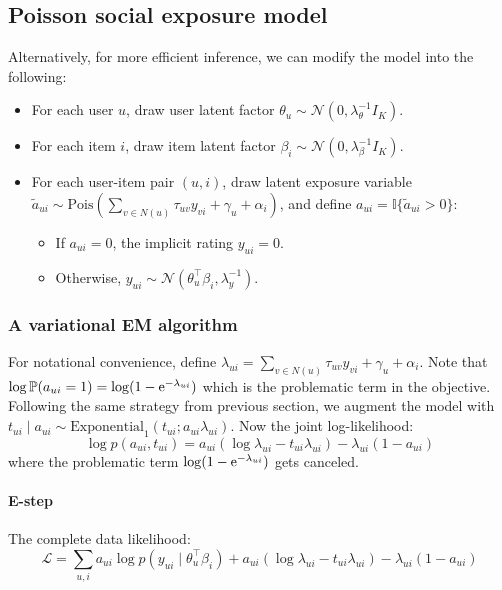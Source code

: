 \subsection*{Poisson social exposure model} Alternatively, for more efficient inference, we can modify the model into the following:
\begin{itemize}
\item For each user $u$, draw user latent factor $\theta_{u} \sim \mathcal{N}(0, \lambda_\theta^{-1} I_K)$.
\item For each item $i$, draw item latent factor $\beta_{i} \sim \mathcal{N}(0, \lambda_\beta^{-1} I_K)$.
\item For each user-item pair $(u, i)$, draw latent exposure variable $\tilde{a}_{ui} \sim \text{Pois}(\sum_{v\in N(u)} \tau_{uv} y_{vi} + \gamma_u + \alpha_i)$, and define $a_{ui} = \mathbb{I}\{\tilde{a}_{ui} > 0\}$:
\begin{itemize}
\item If $a_{ui} = 0$, the implicit rating $y_{ui} = 0$.
\item Otherwise, $y_{ui} \sim \mathcal{N}(\theta_u^\top\beta_i, \lambda_y^{-1})$.
\end{itemize}
\end{itemize}

\subsubsection*{A variational EM algorithm}
For notational convenience, define $\lambda_{ui} = \sum_{v\in N(u)} \tau_{uv} y_{vi} + \gamma_u + \alpha_i$. Note that $\log \mathbb{P}(a_{ui} = 1) = \log (1 - \mathrm{e}^{-\lambda_{ui}})$ which is the problematic term in the objective. Following the same strategy from previous section, we augment the model with $t_{ui} \mid a_{ui} \sim \text{Exponential}_1(t_{ui}; a_{ui}\lambda_{ui})$. Now the joint log-likelihood:
\[
\log p(a_{ui}, t_{ui}) = a_{ui} (\log \lambda_{ui} - t_{ui} \lambda_{ui}) - \lambda_{ui}(1 - a_{ui})
\]
where the problematic term $\log (1 - \mathrm{e}^{-\lambda_{ui}})$ gets canceled.

\paragraph{E-step} The complete data likelihood:
\begin{equation}
\mathcal{L} = \sum_{u, i} a_{ui}\log p(y_{ui} \mid \theta_u^\top\beta_i) + a_{ui} (\log \lambda_{ui} - t_{ui} \lambda_{ui}) - \lambda_{ui}(1 - a_{ui})
\end{equation}

